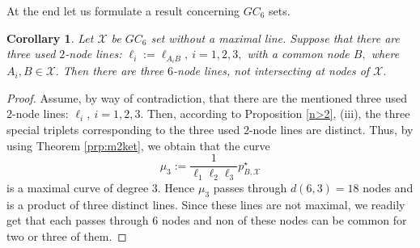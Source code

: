 \documentclass[a4paper,12pt]{article}
\newtheorem{corollary}[lemma]{Corollary}
\theoremstyle{definition}
\numberwithin{equation}{section}
\numberwithin{figure}{section}
\newcommand{\Xset}{\mathcal{X}}
\begin{document}
At the end let us formulate a result concerning $GC_6$ sets.
\begin{corollary}\label{6655} Let $\Xset$ be $GC_6$ set without a maximal line. 
Suppose that there are three used $2$-node lines: $\ell_i:=\ell_{A_iB},\ i=1,2,3,$ with a common node $B,$ where $A_i,B\in \Xset.$ Then there are three $6$-node lines, not intersecting at nodes of $\Xset.$
\end{corollary}
\begin{proof} Assume, by way of contradiction, that there are the mentioned three used $2$-node lines: $\ell_i,\ i=1,2,3.$
Then, according to Proposition \ref{n>2}, (iii),  the three special triplets corresponding to the three used $2$-node lines are distinct. Thus, by using Theorem \ref{prp:m2ket}, we obtain that the curve 
$$\mu_{3}:=\frac{1}{\ell_1 \ell_2 \ell _3}p^\star_{B,\Xset}$$
is a maximal curve of degree $3.$ Hence $\mu_3$ passes through $d(6,3)=18$ nodes and is a product of three distinct lines. Since these lines are not maximal, we readily get that each passes through $6$ nodes and non of these nodes can be common for two or three of them.
\end{proof}
\end{document}
